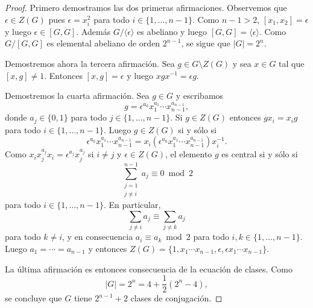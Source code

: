 \begin{proof}
	Primero demostramos las dos primeras afirmaciones. 
	Observemos que $\epsilon\in Z(G)$ pues $\epsilon=x_i^2$ para todo
	$i\in\{1,\dots,n-1\}$. Como $n-1>2$, $[x_1,x_2]=\epsilon$ y luego
	$\epsilon\in [G,G]$. Además $G/\langle\epsilon\rangle$ es abeliano y luego
	$[G,G]=\langle \epsilon\rangle$. Como $G/[G,G]$ es elemental abeliano de
	orden $2^{n-1}$, se sigue que $|G|=2^n$. 

	Demostremos ahora la tercera afirmación. Sea $g\in G\setminus Z(G)$ y sea
	$x\in G$ tal que $[x,g]\ne 1$. Entonces $[x,g]=\epsilon$ y luego
	$xgx^{-1}=\epsilon g$. 

	Demostremos la cuarta afirmación. Sea $g\in G$ y escribamos
	\[
		g=\epsilon^{a_0}x_1^{a_1}\cdots x_{n-1}^{a_{n-1}},
	\]
	donde $a_j\in\{0,1\}$ para todo $j\in\{1,\dots,n-1\}$. Si $g\in Z(G)$ entonces $gx_i=x_ig$ para todo $i\in\{1,\dots,n-1\}$. Luego
	$g\in Z(G)$ si y sólo si 
	\[
		\epsilon^{a_0}x_1^{a_1}\cdots x_{n-1}^{a_{n-1}}=x_i(\epsilon^{a_0}x_1^{a_1}\cdots x_{n-1}^{a_{n-1}})x_i^{-1}.
	\]
	Como $x_ix_j^{a_j}x_i=\epsilon^{a_j}x_j^{a_j}$ si $i\ne j$ y $\epsilon\in Z(G)$, el elemento $g$ es central si y sólo si 
	\[
		\sum_{\substack{j=1\\j\ne i}}^{n-1}a_j\equiv 0\bmod 2
	\]
	para todo $i\in\{1,\dots,n-1\}$. En particular, 
	\[
	\sum_{j\ne i}a_j\equiv \sum_{j\ne k}a_j
	\]
	para todo $k\ne i$, y en consecuencia $a_i\equiv a_k\bmod 2$ para todo
	$i,k\in\{1,\dots,n-1\}$. Luego $a_1=\cdots=a_{n-1}$ y entonces 
	$Z(G)=\{1,x_1\cdots x_{n-1},\epsilon,\epsilon x_1\cdots
	x_{n-1}\}$. 
	
	La última afirmación es entonces consecuencia de la ecuación de clases. Como
	\[
		|G|=2^n=4+\frac12(2^n-4),
	\]
	se concluye que $G$ tiene $2^{n-1}+2$ clases de conjugación.
\end{proof}

